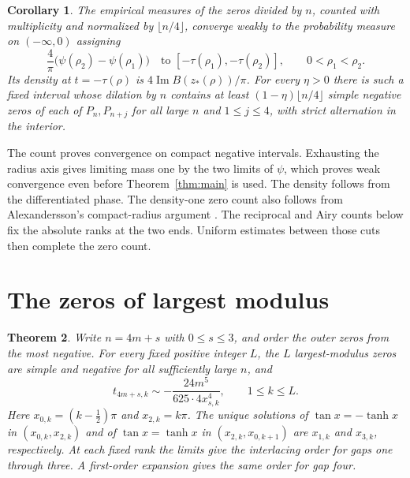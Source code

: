 \documentclass[11pt]{article}
\newtheorem{theorem}{Theorem}
\newtheorem{corollary}[theorem]{Corollary}
\DeclareMathOperator{\Ima}{Im}
\begin{document}
\begin{corollary}\label{cor:distribution}
The empirical measures of the zeros divided by \(n\), counted with multiplicity and normalized by \(\lfloor n/4\rfloor\), converge weakly to the probability measure on \((-\infty,0)\) assigning
\[
 \frac4\pi\bigl(\psi(\rho_2)-\psi(\rho_1)\bigr)
 \quad\text{to }[-\tau(\rho_1),-\tau(\rho_2)],\qquad 0<\rho_1<\rho_2.
\]
Its density at \(t=-\tau(\rho)\) is \(4\Ima B(z_*(\rho))/\pi\). For every \(\eta>0\) there is such a fixed interval whose dilation by \(n\) contains at least \((1-\eta)\lfloor n/4\rfloor\) simple negative zeros of each of \(P_n,P_{n+j}\) for all large \(n\) and \(1\le j\le4\), with strict alternation in the interior.
\end{corollary}
The count proves convergence on compact negative intervals. Exhausting the radius axis gives limiting mass one by the two limits of \(\psi\), which proves weak convergence even before Theorem~\ref{thm:main} is used. The density follows from the differentiated phase.
The density-one zero count also follows from Alexandersson's compact-radius argument \cite{rrdensity}. The reciprocal and Airy counts below fix the absolute ranks at the two ends. Uniform estimates between those cuts then complete the zero count.

\section{The zeros of largest modulus}\label{sec:outer}

\begin{theorem}\label{thm:outer}
Write \(n=4m+s\) with \(0\le s\le3\), and order the outer zeros from the most negative. For every fixed positive integer \(L\), the \(L\) largest-modulus zeros are simple and negative for all sufficiently large \(n\), and
\[
 t_{4m+s,k}\sim-\frac{24m^5}{625\cdot4x_{s,k}^4},\qquad 1\le k\le L.
\]
Here \(x_{0,k}=(k-\tfrac12)\pi\) and \(x_{2,k}=k\pi\).
The unique solutions of \(\tan x=-\tanh x\) in \((x_{0,k},x_{2,k})\) and of \(\tan x=\tanh x\) in \((x_{2,k},x_{0,k+1})\) are \(x_{1,k}\) and \(x_{3,k}\), respectively. At each fixed rank the limits give the interlacing order for gaps one through three. A first-order expansion gives the same order for gap four.
\end{theorem}
\end{document}
